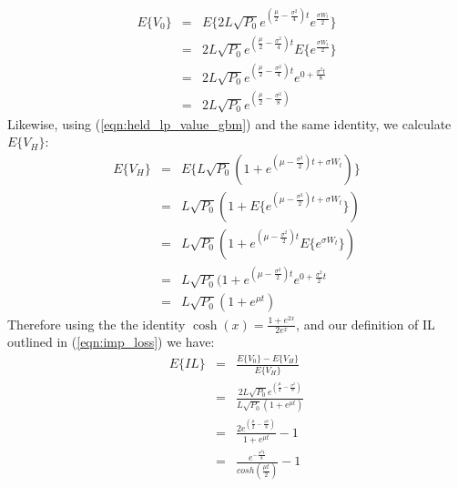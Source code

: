 \documentclass[journal,twocolumn,12pt]{ieeesyscoin}
\begin{document}
\begin{eqnarray*}\label{eqn:derivation_exp_v0}
E\{V_{0}\} &=& E\{2L \sqrt{P_{0}} e^{(\frac{\mu}{2} - \frac{\sigma^2}{4})t } e^{\frac{\sigma W_{t}}{2}} \} \\ 
           &=& 2L \sqrt{P_{0}} e^{(\frac{\mu}{2} - \frac{\sigma^2}{4})t } E\{e^{ \frac{\sigma W_{t}}{2} }\} \\
           &=& 2L \sqrt{P_{0}} e^{(\frac{\mu}{2} - \frac{\sigma^2}{4})t } e^{0+\frac{\sigma^2 t}{8}} \\
           &=&  2L \sqrt{P_{0}}e^{( \frac{\mu}{2} - \frac{\sigma^2}{8})}
\end{eqnarray*}
Likewise, using (\ref{eqn:held_lp_value_gbm}) and the same identity, we calculate $E\{V_{H}\}$: 
\begin{eqnarray*}\label{eqn:derivation_exp_vH}
E\{V_{H}\} &=& E\{L \sqrt{P_{0}}(1 + e^{(\mu - \frac{\sigma^2}{2})t + \sigma W_{t} })\} \\
		   &=& L \sqrt{P_{0}}(1 + E\{ e^{(\mu - \frac{\sigma^2}{2})t + \sigma W_{t} }  \}) \\
		   &=& L \sqrt{P_{0}}(1 + e^{(\mu - \frac{\sigma^2}{2})t} E\{e^{\sigma W_{t}}\} ) \\
		   &=& L \sqrt{P_{0}}(1 + e^{(\mu - \frac{\sigma^2}{2})t} e^{0+\frac{\sigma^2}{2}t} \\
		   &=& L \sqrt{P_{0}}(1 + e^{\mu t} )
\end{eqnarray*}
Therefore using the the identity $\cosh(x) = \frac{1 + e^{2x}}{2 e^x}$, and our definition of IL outlined in (\ref{eqn:imp_loss})  we have:
\begin{eqnarray*}\label{eqn:derivation_exp_IL}
E\{IL\} &=& \frac{E\{V_{0}\} - E\{V_{H}\}}{E\{V_{H}\}} \\
		&=& \frac{2L \sqrt{P_{0}}e^{( \frac{\mu}{2} - \frac{\sigma^2}{8})} }{L \sqrt{P_{0}}(1 + e^{\mu t} )}\\
		&=& \frac{2e^{( \frac{\mu}{2} - \frac{\sigma^2}{8})}}{1 + e^{\mu t}} - 1\\
		&=& \frac{e^{-\frac{\sigma^2 t}{8}}}{ cosh(\frac{\mu t}{2})} - 1
\end{eqnarray*}
\end{document}
